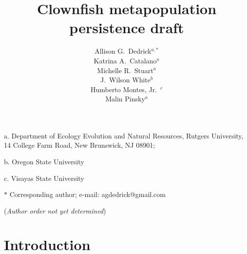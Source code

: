\documentclass[12pt, oneside]{article}   	%
\author{}
\author{Allison G.\ Dedrick$^{a, \ast}$ \\
Katrina A.\ Catalano$^a$ \\
Michelle R.\ Stuart$^a$ \\
J.\ Wilson White$^b$ \\
Humberto Montes, Jr.\ $^c$ \\
Malin Pinsky$^a$}
\title{Clownfish metapopulation persistence draft}
\date{}
\begin{document}
\renewcommand{\topfraction}{0.95}
\maketitle{}

\noindent{} a. Department of Ecology Evolution and Natural Resources, Rutgers University, 14 College Farm Road, New Brunswick, NJ 08901;

\noindent{} b. Oregon State University

\noindent{} c. Visayas State University

\noindent{} $\ast$ Corresponding author; e-mail: agdedrick@gmail.com

(\textit{Author order not yet determined})


\bigskip






\linenumbers{}
\modulolinenumbers[3]

\section*{Introduction}
\end{document}

